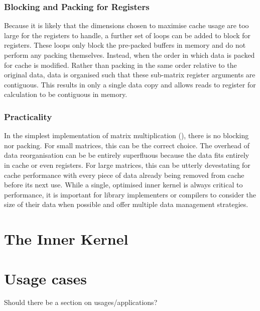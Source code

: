 \documentclass[\main/thesis.tex]{subfiles}
\begin{document}
\subsubsection{Blocking and Packing for Registers}
Because it is likely that the dimensions chosen to maximise cache usage are too large for the registers to handle, a further set of loops can be added to block for registers.
These loops only block the pre-packed buffers in memory and do not perform any packing themselves.
Instead, when the order in which data is packed for cache is modified.
Rather than packing in the same order relative to the original data, data is organised such that these sub-matrix register arguments are contiguous.
This results in only a single data copy and allows reads to register for calculation to be contiguous in memory.

\subsubsection{Practicality}
In the simplest implementation of matrix multiplication (\ie {}), there is no blocking nor packing.
For small matrices, this can be the correct choice.
The overhead of data reorganisation can be be entirely superfluous because the data fits entirely in cache or even registers.
For large matrices, this can be utterly devestating for cache performance with every piece of data already being removed from cache before its next use.
While a single, optimised inner kernel is always critical to performance, it is important for library implementers or compilers to consider the size of their data when possible and offer multiple data management strategies.

\section{The Inner Kernel}

\section{Usage cases}
Should there be a section on usages/applications?
\end{document}
